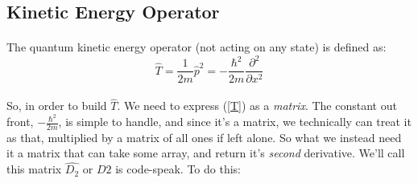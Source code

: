 \documentclass[12pt,letterpaper]{book}
\begin{document}

\subsection*{Kinetic Energy Operator}

\paragraph*{}The quantum kinetic energy operator (not acting on any state) is defined as:
\begin{equation}
\label{T}
\hat{T} = \frac{1}{2m}\hat{p}^2 = -\frac{\hbar^2}{2m} \frac{\partial^2}{\partial x^2}
\end{equation}
\paragraph*{}So, in order to build $\hat{T}$. We need to express (\ref{T}) as a \textit{matrix}. The constant out front, $-\frac{\hbar^2}{2m}$, is simple to handle, and since it's a matrix, we technically can treat it as that, multiplied by a matrix of all ones if left alone. So what we instead need it a matrix that can take some array, and return it's \textit{second} derivative. We'll call this matrix $\hat{D_2}$ or $D2$ is code-speak. To do this:




\end{document}

